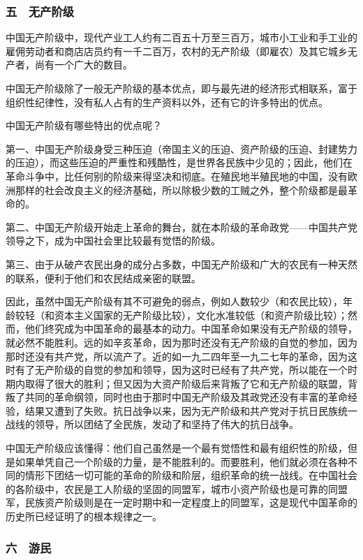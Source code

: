 \subsubsection{五　无产阶级}

中国无产阶级中，现代产业工人约有二百五十万至三百万，城市小工业和手工业的雇佣劳动者和商店店员约有一千二百万，农村的无产阶级（即雇农）及其它城乡无产者，尚有一个广大的数目。

中国无产阶级除了一般无产阶级的基本优点，即与最先进的经济形式相联系，富于组织性纪律性，没有私人占有的生产资料以外，还有它的许多特出的优点。

中国无产阶级有哪些特出的优点呢？

第一、中国无产阶级身受三种压迫（帝国主义的压迫、资产阶级的压迫、封建势力的压迫），而这些压迫的严重性和残酷性，是世界各民族中少见的；因此，他们在革命斗争中，比任何别的阶级来得坚决和彻底。在殖民地半殖民地的中国，没有欧洲那样的社会改良主义的经济基础，所以除极少数的工贼之外，整个阶级都是最革命的。

第二、中国无产阶级开始走上革命的舞台，就在本阶级的革命政党——中国共产党领导之下，成为中国社会里比较最有觉悟的阶级。

第三、由于从破产农民出身的成分占多数，中国无产阶级和广大的农民有一种天然的联系，便利于他们和农民结成亲密的联盟。

因此，虽然中国无产阶级有其不可避免的弱点，例如人数较少（和农民比较），年龄较轻（和资本主义国家的无产阶级比较），文化水准较低（和资产阶级比较）；然而，他们终究成为中国革命的最基本的动力。中国革命如果没有无产阶级的领导，就必然不能胜利。远的如辛亥革命，因为那时还没有无产阶级的自觉的参加，因为那时还没有共产党，所以流产了。近的如一九二四年至一九二七年的革命，因为这时有了无产阶级的自觉的参加和领导，因为这时已经有了共产党，所以能在一个时期内取得了很大的胜利；但又因为大资产阶级后来背叛了它和无产阶级的联盟，背叛了共同的革命纲领，同时也由于那时中国无产阶级及其政党还没有丰富的革命经验，结果又遭到了失败。抗日战争以来，因为无产阶级和共产党对于抗日民族统一战线的领导，所以团结了全民族，发动了和坚持了伟大的抗日战争。

中国无产阶级应该懂得：他们自己虽然是一个最有觉悟性和最有组织性的阶级，但是如果单凭自己一个阶级的力量，是不能胜利的。而要胜利，他们就必须在各种不同的情形下团结一切可能的革命的阶级和阶层，组织革命的统一战线。在中国社会的各阶级中，农民是工人阶级的坚固的同盟军，城市小资产阶级也是可靠的同盟军，民族资产阶级则是在一定时期中和一定程度上的同盟军，这是现代中国革命的历史所已经证明了的根本规律之一。

\subsubsection{六　游民}

